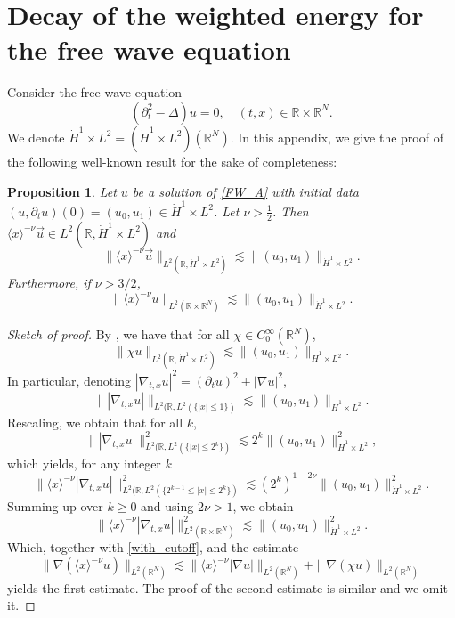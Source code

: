 \documentclass[10pt,leqno]{amsart}
\newtheorem{proposition}[theorem]{Proposition}
\theoremstyle{definition}%
\theoremstyle{remark}
\numberwithin{equation}{section}
\newcommand{\R}{\mathbb{R}}
\renewcommand{\^}{\widehat}%
\newcommand{\la}{\langle}
\newcommand{\ra}{\rangle}
\begin{document}
\appendix

\section{Decay of the weighted energy for the free wave equation}
\label{A:free_weighted}
Consider the free wave equation 
\begin{equation}
\label{FW_A}
(\partial_t^2-\Delta)u=0,\quad (t,x)\in \R\times \R^N.
\end{equation} 
We denote $\dot{H}^1\times L^2=(\dot{H}^1\times L^2)(\R^N)$. In this appendix, we give the proof of the following well-known result for the sake of completeness:
\begin{proposition}
	Let $u$ be a solution of \eqref{FW_A} with initial data $(u,\partial_tu)(0)=(u_0,u_1)\in \dot{H}^1\times L^2$. Let $\nu>\frac{1}{2}$. Then $\la x\ra^{-\nu}\vec{u}\in L^2(\R,\dot{H}^1\times L^2)$ and 
	$$ \|\la x\ra^{-\nu}\vec{u}\|_{L^2(\R,\dot{H}^1\times L^2)}\lesssim \|(u_0,u_1)\|_{\dot{H}^1\times L^2}.$$
	Furthermore, if $\nu>3/2$, 
	$$ \|\la x\ra^{-\nu}u\|_{L^2(\R\times \R^N)}\lesssim \|(u_0,u_1)\|_{\dot{H}^1\times L^2}.$$
\end{proposition}
\begin{proof}[Sketch of proof]
	By \cite[Corollary 2.3]{SmithSogge00}, we have that for all $\chi\in C_0^{\infty}(\R^N)$, 
	\begin{equation}
	\label{with_cutoff}
	\|\chi u\|_{L^2(\R,\dot{H}^1\times L^2)}\lesssim \|(u_0,u_1)\|_{\dot{H}^1\times L^2}. 
	\end{equation} 
	In particular, denoting $|\nabla_{t,x}u|^2=(\partial_tu)^2+|\nabla u|^2$, 
	$$ \Big\| |\nabla_{t,x}u| \Big\|_{L^2(\R,L^2(\{|x|\leq 1\})}\lesssim \|(u_0,u_1)\|_{\dot{H}^1\times L^2}. $$
	Rescaling, we obtain that for all $k$,
	$$ \Big\| |\nabla_{t,x}u| \Big\|_{L^2(\R,L^2(\{|x|\leq 2^k\})}^2\lesssim 2^k\|(u_0,u_1)\|_{\dot{H}^1\times L^2}^2, $$
	which yields, for any integer $k$
	$$ \Big\|\langle x\rangle^{-\nu} |\nabla_{t,x}u| \Big\|_{L^2(\R,L^2(\{2^{k-1}\leq |x|\leq 2^k\})}^2\lesssim \left(2^{k}\right)^{1-2\nu}\|(u_0,u_1)\|_{\dot{H}^1\times L^2}^2. $$
	Summing up over $k\geq 0$ and using $2\nu>1$, we obtain 
	$$ \Big\|\langle x\rangle^{-\nu} |\nabla_{t,x}u| \Big\|_{L^2(\R\times \R^N)}^2\lesssim \|(u_0,u_1)\|_{\dot{H}^1\times L^2}^2. $$
	Which, together with \eqref{with_cutoff}, and the estimate $$\|\nabla (\langle x\rangle^{-\nu}u)\|_{L^2(\R^N)}\lesssim \|\langle x\rangle^{-\nu}|\nabla u|\|_{L^2(\R^N)}+\|\nabla (\chi u)\|_{L^2(\R^N)}$$ yields the first estimate. The proof of the second estimate is similar and we omit it.
\end{proof}
\end{document}
